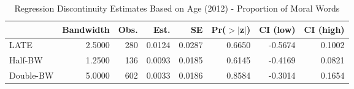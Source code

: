 \begin{table}[ht]
\centering
\begin{tabular}{lrrrrrrr}
  \hline
 & Bandwidth & Obs. & Est. & SE & Pr($>$$|$z$|$) & CI (low) & CI (high) \\ 
  \hline
LATE & 2.5000 & 280 & 0.0124 & 0.0287 & 0.6650 & -0.5674 & 0.1002 \\ 
  Half-BW & 1.2500 & 136 & 0.0093 & 0.0185 & 0.6145 & -0.4169 & 0.0821 \\ 
  Double-BW & 5.0000 & 602 & 0.0033 & 0.0186 & 0.8584 & -0.3014 & 0.1654 \\ 
   \hline
\end{tabular}
\caption{Regression Discontinuity Estimates Based on Age (2012) - Proportion of Moral Words} 
\label{tab:Xrd2012y}
\end{table}

